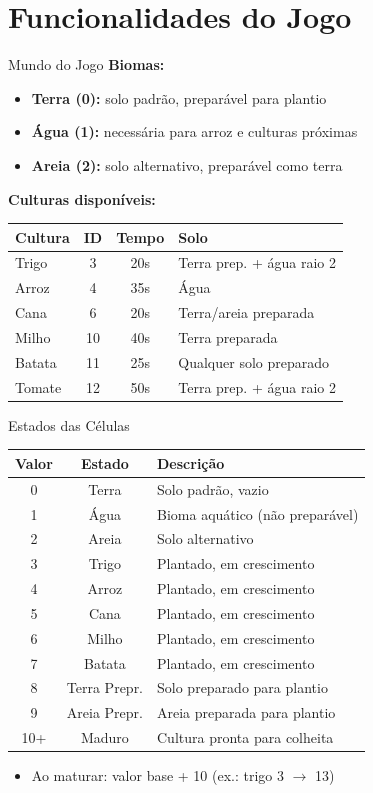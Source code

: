 \documentclass[aspectratio=169]{beamer}
\begin{document}
\section{Funcionalidades do Jogo}

\begin{frame}{Mundo do Jogo}
  \textbf{Biomas:}
  \begin{itemize}
    \item \textbf{Terra (0):} solo padr\~ao, prepar\'avel para plantio
    \item \textbf{\'Agua (1):} necess\'aria para arroz e culturas pr\'oximas
    \item \textbf{Areia (2):} solo alternativo, prepar\'avel como terra
  \end{itemize}
  \vfill
  \textbf{Culturas dispon\'iveis:}
  \footnotesize
  \begin{tabular}{lccl}
    \toprule
    \textbf{Cultura} & \textbf{ID} & \textbf{Tempo} & \textbf{Solo} \\
    \midrule
    Trigo  & 3  & 20s & Terra prep. + \'agua raio 2 \\
    Arroz  & 4  & 35s & \'Agua \\
    Cana   & 6  & 20s & Terra/areia preparada \\
    Milho  & 10 & 40s & Terra preparada \\
    Batata & 11 & 25s & Qualquer solo preparado \\
    Tomate & 12 & 50s & Terra prep. + \'agua raio 2 \\
    \bottomrule
  \end{tabular}
\end{frame}

\begin{frame}{Estados das C\'elulas}
  \footnotesize
  \begin{tabular}{ccl}
    \toprule
    \textbf{Valor} & \textbf{Estado} & \textbf{Descri\c{c}\~ao} \\
    \midrule
    0  & Terra & Solo padr\~ao, vazio \\
    1  & \'Agua & Bioma aqu\'atico (n\~ao prepar\'avel) \\
    2  & Areia & Solo alternativo \\
    3  & Trigo & Plantado, em crescimento \\
    4  & Arroz & Plantado, em crescimento \\
    5  & Cana & Plantado, em crescimento \\
    6  & Milho & Plantado, em crescimento \\
    7  & Batata & Plantado, em crescimento \\
    8  & Terra Prepr. & Solo preparado para plantio \\
    9  & Areia Prepr. & Areia preparada para plantio \\
    10+ & Maduro & Cultura pronta para colheita \\
    \bottomrule
  \end{tabular}
  \begin{itemize}
    \item Ao maturar: valor base + 10 (ex.: trigo 3 $\rightarrow$ 13)
  \end{itemize}
\end{frame}
\end{document}

